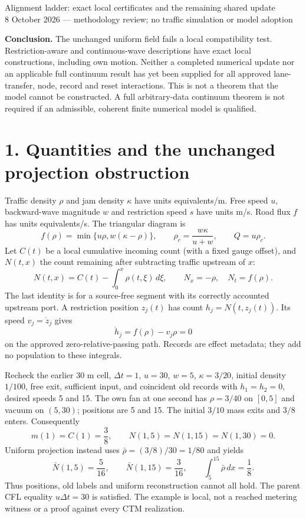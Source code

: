 \documentclass[11pt,a4paper]{article}
\begin{document}
{\Large Alignment ladder: exact local certificates and the remaining shared update}\\[4pt]
8 October 2026 --- methodology review; no traffic simulation or model adoption

\textbf{Conclusion.} The unchanged uniform field fails a local compatibility
test. Restriction-aware and continuous-wave descriptions have exact local
constructions, including own motion. Neither a completed numerical update nor
an applicable full continuum result has yet been supplied for all approved
lane-transfer, node, record and reset interactions. This is not a theorem that
the model cannot be constructed. A full arbitrary-data continuum theorem is
not required if an admissible, coherent finite numerical model is qualified.

\section*{1. Quantities and the unchanged projection obstruction}
Traffic density $\rho$ and jam density $\kappa$ have units equivalents/m.
Free speed $u$, backward-wave magnitude $w$ and restriction speed $s$ have
units m/s. Road flux $f$ has units equivalents/s. The triangular diagram is
\begin{equation}
 f(\rho)=\min\{u\rho,w(\kappa-\rho)\},\qquad
 \rho_c=\frac{w\kappa}{u+w},\qquad Q=u\rho_c.
\end{equation}
Let $C(t)$ be a local cumulative incoming count (with a fixed gauge offset),
and $N(t,x)$ the count remaining after subtracting traffic upstream of $x$:
\begin{equation}
 N(t,x)=C(t)-\int_0^x\rho(t,\xi)\,d\xi,\qquad
 N_x=-\rho,\quad N_t=f(\rho).
\end{equation}
The last identity is for a source-free segment with its correctly accounted
upstream port. A restriction position $z_j(t)$ has count $h_j=N(t,z_j(t))$.
Its speed $v_j=\dot z_j$ gives
\begin{equation}
 \dot h_j=f(\rho)-v_j\rho=0
\end{equation}
on the approved zero-relative-passing path. Records are effect metadata;
they add no population to these integrals.

Recheck the earlier 30 m cell, $\Delta t=1$, $u=30$, $w=5$, $\kappa=3/20$,
initial density $1/100$, free exit, sufficient input, and coincident old
records with $h_1=h_2=0$, desired speeds 5 and 15. The own fan at one second
has $\rho=3/40$ on $[0,5]$ and vacuum on $(5,30)$; positions are 5 and 15.
The initial $3/10$ mass exits and $3/8$ enters. Consequently
\begin{equation}
 m(1)=C(1)=\frac38,\qquad N(1,5)=N(1,15)=N(1,30)=0.
\end{equation}
Uniform projection instead uses $\bar\rho=(3/8)/30=1/80$ and yields
\begin{equation}
 \bar N(1,5)=\frac5{16},\qquad \bar N(1,15)=\frac3{16},\qquad
 \int_5^{15}\bar\rho\,dx=\frac18.
\end{equation}
Thus positions, old labels and uniform reconstruction cannot all hold.
The parent CFL equality $u\Delta t=30$ is satisfied. The example is local,
not a reached metering witness or a proof against every CTM realization.
\end{document}
